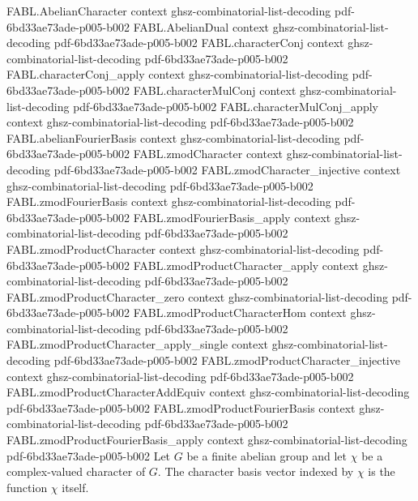 \begin{theorem}
\label{FABL.abelianFourierBasis_apply}
\leanok
{}
\proofstep
  {FABL.AbelianCharacter}
  {context}
  {ghsz-combinatorial-list-decoding}
  {pdf-6bd33ae73ade-p005-b002}
\proofstep
  {FABL.AbelianDual}
  {context}
  {ghsz-combinatorial-list-decoding}
  {pdf-6bd33ae73ade-p005-b002}
\proofstep
  {FABL.characterConj}
  {context}
  {ghsz-combinatorial-list-decoding}
  {pdf-6bd33ae73ade-p005-b002}
\proofstep
  {FABL.characterConj_apply}
  {context}
  {ghsz-combinatorial-list-decoding}
  {pdf-6bd33ae73ade-p005-b002}
\proofstep
  {FABL.characterMulConj}
  {context}
  {ghsz-combinatorial-list-decoding}
  {pdf-6bd33ae73ade-p005-b002}
\proofstep
  {FABL.characterMulConj_apply}
  {context}
  {ghsz-combinatorial-list-decoding}
  {pdf-6bd33ae73ade-p005-b002}
\proofstep
  {FABL.abelianFourierBasis}
  {context}
  {ghsz-combinatorial-list-decoding}
  {pdf-6bd33ae73ade-p005-b002}
\proofstep
  {FABL.zmodCharacter}
  {context}
  {ghsz-combinatorial-list-decoding}
  {pdf-6bd33ae73ade-p005-b002}
\proofstep
  {FABL.zmodCharacter_injective}
  {context}
  {ghsz-combinatorial-list-decoding}
  {pdf-6bd33ae73ade-p005-b002}
\proofstep
  {FABL.zmodFourierBasis}
  {context}
  {ghsz-combinatorial-list-decoding}
  {pdf-6bd33ae73ade-p005-b002}
\proofstep
  {FABL.zmodFourierBasis_apply}
  {context}
  {ghsz-combinatorial-list-decoding}
  {pdf-6bd33ae73ade-p005-b002}
\proofstep
  {FABL.zmodProductCharacter}
  {context}
  {ghsz-combinatorial-list-decoding}
  {pdf-6bd33ae73ade-p005-b002}
\proofstep
  {FABL.zmodProductCharacter_apply}
  {context}
  {ghsz-combinatorial-list-decoding}
  {pdf-6bd33ae73ade-p005-b002}
\proofstep
  {FABL.zmodProductCharacter_zero}
  {context}
  {ghsz-combinatorial-list-decoding}
  {pdf-6bd33ae73ade-p005-b002}
\proofstep
  {FABL.zmodProductCharacterHom}
  {context}
  {ghsz-combinatorial-list-decoding}
  {pdf-6bd33ae73ade-p005-b002}
\proofstep
  {FABL.zmodProductCharacter_apply_single}
  {context}
  {ghsz-combinatorial-list-decoding}
  {pdf-6bd33ae73ade-p005-b002}
\proofstep
  {FABL.zmodProductCharacter_injective}
  {context}
  {ghsz-combinatorial-list-decoding}
  {pdf-6bd33ae73ade-p005-b002}
\proofstep
  {FABL.zmodProductCharacterAddEquiv}
  {context}
  {ghsz-combinatorial-list-decoding}
  {pdf-6bd33ae73ade-p005-b002}
\proofstep
  {FABL.zmodProductFourierBasis}
  {context}
  {ghsz-combinatorial-list-decoding}
  {pdf-6bd33ae73ade-p005-b002}
\proofstep
  {FABL.zmodProductFourierBasis_apply}
  {context}
  {ghsz-combinatorial-list-decoding}
  {pdf-6bd33ae73ade-p005-b002}
Let $G$ be a finite abelian group and let $\chi$ be a complex-valued character of $G$.
The character basis vector indexed by $\chi$ is the function $\chi$ itself.
\end{theorem}

